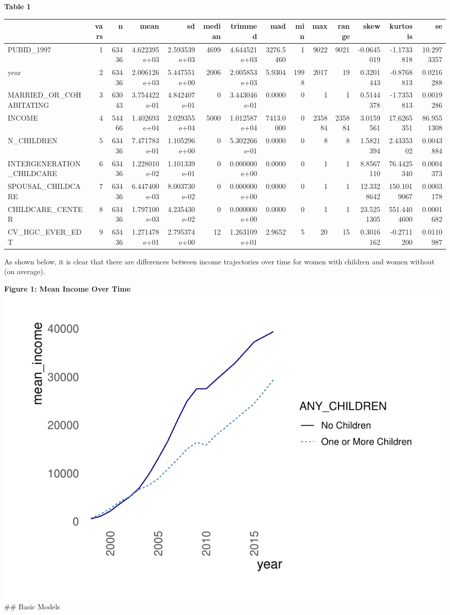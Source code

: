 \documentclass[
]{article}
\begin{document}
\textbf{Table 1}

\begin{tabular}{l|r|r|r|r|r|r|r|r|r|r|r|r|r}
\hline
  & vars & n & mean & sd & median & trimmed & mad & min & max & range & skew & kurtosis & se\\
\hline
PUBID\_1997 & 1 & 63436 & 4.622395e+03 & 2.593539e+03 & 4699 & 4.644521e+03 & 3276.5460 & 1 & 9022 & 9021 & -0.0645019 & -1.1733818 & 10.2973357\\
\hline
year & 2 & 63436 & 2.006126e+03 & 5.447551e+00 & 2006 & 2.005853e+03 & 5.9304 & 1998 & 2017 & 19 & 0.3201443 & -0.8768813 & 0.0216288\\
\hline
MARRIED\_OR\_COHABITATING & 3 & 63043 & 3.754422e-01 & 4.842407e-01 & 0 & 3.443046e-01 & 0.0000 & 0 & 1 & 1 & 0.5144378 & -1.7353813 & 0.0019286\\
\hline
INCOME & 4 & 54466 & 1.402693e+04 & 2.029355e+04 & 5000 & 1.012587e+04 & 7413.0000 & 0 & 235884 & 235884 & 3.0159561 & 17.6265351 & 86.9551308\\
\hline
N\_CHILDREN & 5 & 63436 & 7.471783e-01 & 1.105296e+00 & 0 & 5.302266e-01 & 0.0000 & 0 & 8 & 8 & 1.5821394 & 2.4335302 & 0.0043884\\
\hline
INTERGENERATION\_CHILDCARE & 6 & 63436 & 1.228010e-02 & 1.101339e-01 & 0 & 0.000000e+00 & 0.0000 & 0 & 1 & 1 & 8.8567110 & 76.4425340 & 0.0004373\\
\hline
SPOUSAL\_CHILDCARE & 7 & 63436 & 6.447400e-03 & 8.003730e-02 & 0 & 0.000000e+00 & 0.0000 & 0 & 1 & 1 & 12.3328642 & 150.1019067 & 0.0003178\\
\hline
CHILDCARE\_CENTER & 8 & 63436 & 1.797100e-03 & 4.235430e-02 & 0 & 0.000000e+00 & 0.0000 & 0 & 1 & 1 & 23.5251305 & 551.4404600 & 0.0001682\\
\hline
CV\_HGC\_EVER\_EDT & 9 & 63436 & 1.271478e+01 & 2.795374e+00 & 12 & 1.263109e+01 & 2.9652 & 5 & 20 & 15 & 0.3016162 & -0.2711200 & 0.0110987\\
\hline
\end{tabular}

As shown below, it is clear that there are differences between income
trajectories over time for women with children and women without (on
average).

\textbf{Figure 1: Mean Income Over Time}
\includegraphics{Exploratory_Analysis_files/figure-latex/Figure 1-1.pdf}
\#\# Basic Models
\end{document}
